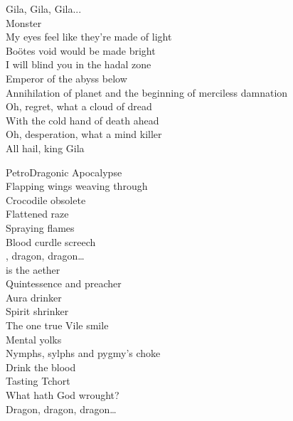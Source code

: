 Gila, Gila, Gila... \\
Monster \\

My eyes feel like they're made of light \\
Boötes void would be made bright \\
I will blind you in the hadal zone \\
Emperor of the abyss below \\

Annihilation of planet  and the beginning of merciless damnation \\

Oh, regret, what a cloud of dread \\
With the cold hand of death ahead \\
Oh, desperation, what a mind killer \\
All hail, king Gila \\



PetroDragonic Apocalypse \\

Flapping wings weaving through \\
Crocodile obsolete \\
Flattened raze \\
Spraying flames \\
Blood curdle screech \\

, dragon, dragon… \\

 is the aether \\
Quintessence and preacher \\
Aura drinker \\
Spirit shrinker \\
The one true 
Vile smile \\
Mental yolks \\
Nymphs, sylphs and pygmy's choke \\
Drink the blood \\
Tasting Tchort \\
What hath God wrought? \\

Dragon, dragon, dragon… \\

